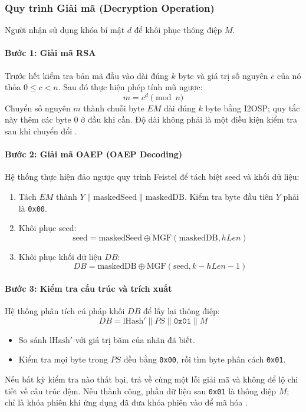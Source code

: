 \subsubsection{Quy trình Giải mã (Decryption Operation)}
Người nhận sử dụng khóa bí mật $d$ để khôi phục thông điệp $M$.

\paragraph{Bước 1: Giải mã RSA}
Trước hết kiểm tra bản mã đầu vào dài đúng $k$ byte và giá trị số nguyên $c$ của nó thỏa $0\leq c<n$. Sau đó thực hiện phép tính mũ ngược:
\begin{equation}
    m = c^d \pmod n
\end{equation}
Chuyển số nguyên $m$ thành chuỗi byte $EM$ dài đúng $k$ byte bằng I2OSP; quy tắc này thêm các byte 0 ở đầu khi cần. Độ dài không phải là một điều kiện kiểm tra sau khi chuyển đổi \cite{rsa8017}.

\paragraph{Bước 2: Giải mã OAEP (OAEP Decoding)}
Hệ thống thực hiện đảo ngược quy trình Feistel để tách biệt seed và khối dữ liệu:
\begin{enumerate}
    \item Tách $EM$ thành $Y \parallel \text{maskedSeed} \parallel \text{maskedDB}$. Kiểm tra byte đầu tiên $Y$ phải là \texttt{0x00}.
    \item Khôi phục seed:
    \begin{equation}
        \text{seed} = \text{maskedSeed} \oplus \text{MGF}(\text{maskedDB}, hLen)
    \end{equation}
    \item Khôi phục khối dữ liệu $DB$:
    \begin{equation}
        DB = \text{maskedDB} \oplus \text{MGF}(\text{seed}, k - hLen - 1)
    \end{equation}
\end{enumerate}

\paragraph{Bước 3: Kiểm tra cấu trúc và trích xuất}
Hệ thống phân tích cú pháp khối $DB$ để lấy lại thông điệp:
\begin{equation}
    DB = \text{lHash}' \parallel PS \parallel \texttt{0x01} \parallel M
\end{equation}
\begin{itemize}
    \item So sánh $\text{lHash}'$ với giá trị băm của nhãn đã biết.
    \item Kiểm tra mọi byte trong $PS$ đều bằng \texttt{0x00}, rồi tìm byte phân cách \texttt{0x01}.
\end{itemize}
Nếu bất kỳ kiểm tra nào thất bại, trả về cùng một lỗi giải mã và không để lộ chi tiết về cấu trúc đệm. Nếu thành công, phần dữ liệu sau \texttt{0x01} là thông điệp $M$; chỉ là khóa phiên khi ứng dụng đã đưa khóa phiên vào để mã hóa \cite{rsa8017}.

